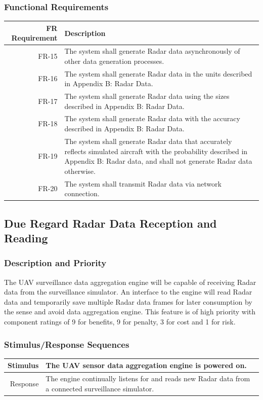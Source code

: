 \documentclass[12pt,oneside,letterpaper]{article}
\begin{document}
\subsubsection{Functional Requirements}
\begin{longtable}{|r|p{3.8in}|}
\hline
FR Requirement & Description \\
\hline
FR-15 & The system shall generate Radar data asynchronously of other data generation processes. \\
\hline
FR-16 & The system shall generate Radar data in the units described in Appendix B: Radar Data. \\
\hline
FR-17 & The system shall generate Radar data using the sizes described in Appendix B: Radar Data. \\
\hline
FR-18 & The system shall generate Radar data with the accuracy described in Appendix B: Radar Data. \\
\hline
FR-19 & The system shall generate Radar data that accurately reflects simulated aircraft with the probability described in Appendix B: Radar data, and shall not generate Radar data otherwise. \\
\hline
FR-20 & The system shall transmit Radar data via network connection. \\
\hline
\end{longtable}

\subsection{Due Regard Radar Data Reception and Reading}
\subsubsection{Description and Priority}
The UAV surveillance data aggregation engine will be capable of receiving Radar data from the surveillance simulator. An interface to the engine will read Radar data and temporarily save multiple Radar data frames for later consumption by the sense and avoid data aggregation engine. This feature is of high priority with component ratings of 9 for benefits, 9 for penalty, 3 for cost and 1 for risk.
\subsubsection{Stimulus/Response Sequences}
\begin{longtable}{|r|p{3.8in}|}
\hline
Stimulus & The UAV sensor data aggregation engine is powered on. \\
\hline
Response & The engine continually listens for and reads new Radar data from a connected surveillance simulator. \\
\hline
\end{longtable}
\end{document}

